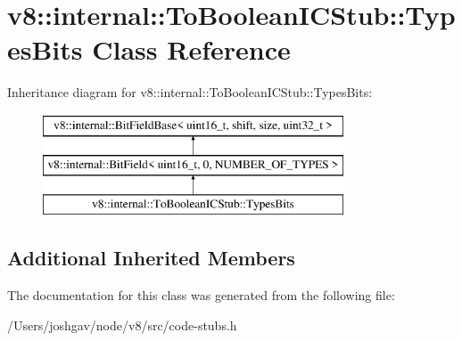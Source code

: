 \hypertarget{classv8_1_1internal_1_1_to_boolean_i_c_stub_1_1_types_bits}{}\section{v8\+:\+:internal\+:\+:To\+Boolean\+I\+C\+Stub\+:\+:Types\+Bits Class Reference}
\label{classv8_1_1internal_1_1_to_boolean_i_c_stub_1_1_types_bits}
Inheritance diagram for v8\+:\+:internal\+:\+:To\+Boolean\+I\+C\+Stub\+:\+:Types\+Bits\+:\begin{figure}[H]
\begin{center}
\leavevmode
\includegraphics[height=3.000000cm]{classv8_1_1internal_1_1_to_boolean_i_c_stub_1_1_types_bits}
\end{center}
\end{figure}
\subsection*{Additional Inherited Members}


The documentation for this class was generated from the following file\+:\begin{DoxyCompactItemize}
\item 
/\+Users/joshgav/node/v8/src/code-\/stubs.\+h\end{DoxyCompactItemize}
